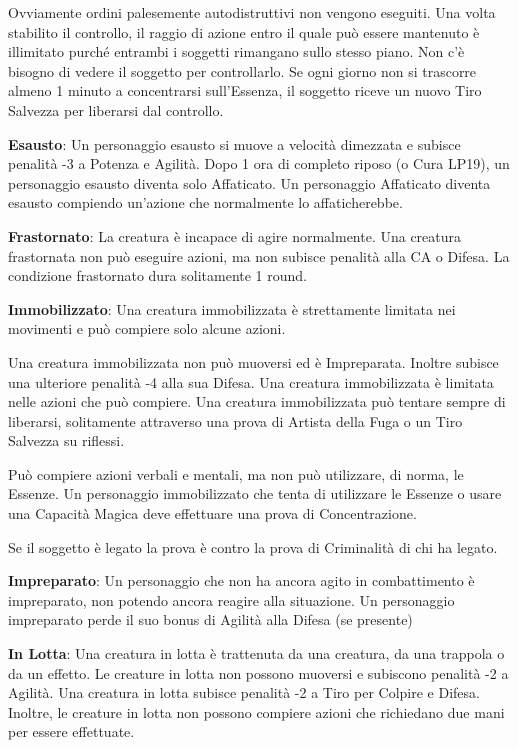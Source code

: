 \documentclass[a4paper,11pt,twoside,openany]{book}
\begin{document}
Ovviamente ordini palesemente autodistruttivi non vengono eseguiti. Una volta stabilito il controllo, il raggio di azione entro il quale può essere mantenuto è illimitato purché entrambi i soggetti rimangano sullo stesso piano. Non c'è bisogno di vedere il soggetto per controllarlo. Se ogni giorno non si trascorre almeno 1 minuto a concentrarsi sull'Essenza, il soggetto riceve un nuovo Tiro Salvezza per liberarsi dal controllo.

\textbf{Esausto}: Un personaggio esausto si muove a velocità dimezzata e subisce penalità -3 a Potenza e Agilità. Dopo 1 ora di completo riposo (o Cura LP19), un personaggio esausto diventa solo Affaticato. Un personaggio Affaticato diventa esausto compiendo un'azione che normalmente lo affaticherebbe.

\textbf{Frastornato}: La creatura è incapace di agire normalmente.
Una creatura frastornata non può eseguire azioni, ma non subisce penalità alla CA o Difesa. La condizione frastornato dura solitamente 1 round.

\textbf{Immobilizzato}: Una creatura immobilizzata è strettamente limitata nei movimenti e può compiere solo alcune azioni.

Una creatura immobilizzata non può muoversi ed è Impreparata. Inoltre subisce una ulteriore penalità -4 alla sua Difesa. Una creatura immobilizzata è limitata nelle azioni che può compiere. Una creatura immobilizzata può tentare sempre di liberarsi, solitamente attraverso una prova di Artista della Fuga o un Tiro Salvezza su riflessi.

Può compiere azioni verbali e mentali, ma non può utilizzare, di norma, le Essenze. Un personaggio immobilizzato che tenta di utilizzare le Essenze o usare una Capacità Magica deve effettuare una prova di Concentrazione.

Se il soggetto è legato la prova è contro la prova di Criminalità di chi ha legato.

\textbf{Impreparato}: Un personaggio che non ha ancora agito in combattimento è impreparato, non potendo ancora reagire alla situazione. Un personaggio impreparato perde il suo bonus di Agilità alla Difesa (se presente)

\textbf{In Lotta}: Una creatura in lotta è trattenuta da una creatura,
da una trappola o da un effetto. Le creature in lotta non possono
muoversi e subiscono penalità -2 a Agilità. Una creatura in lotta
subisce penalità -2 a Tiro per Colpire e Difesa. Inoltre, le creature
in lotta non possono compiere azioni che richiedano due mani per essere
effettuate.
\end{document}

